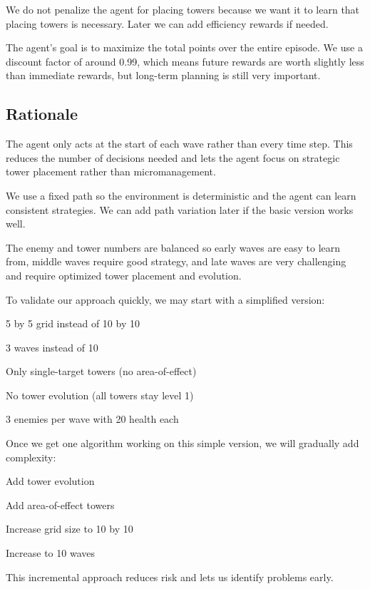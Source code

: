 \documentclass[12pt]{article}
\begin{document}
We do not penalize the agent for placing towers because we want it to learn that placing towers is necessary. Later we can add efficiency rewards if needed.

The agent's goal is to maximize the total points over the entire episode. We use a discount factor of around 0.99, which means future rewards are worth slightly less than immediate rewards, but long-term planning is still very important.

\subsection*{Rationale}

The agent only acts at the start of each wave rather than every time step. This reduces the number of decisions needed and lets the agent focus on strategic tower placement rather than micromanagement.

We use a fixed path so the environment is deterministic and the agent can learn consistent strategies. We can add path variation later if the basic version works well.

The enemy and tower numbers are balanced so early waves are easy to learn from, middle waves require good strategy, and late waves are very challenging and require optimized tower placement and evolution.

To validate our approach quickly, we may start with a simplified version:
\begin{compactitem}
\item 5 by 5 grid instead of 10 by 10
\item 3 waves instead of 10
\item Only single-target towers (no area-of-effect)
\item No tower evolution (all towers stay level 1)
\item 3 enemies per wave with 20 health each
\end{compactitem}

Once we get one algorithm working on this simple version, we will gradually add complexity:
\begin{compactitem}
\item Add tower evolution
\item Add area-of-effect towers
\item Increase grid size to 10 by 10
\item Increase to 10 waves
\end{compactitem}

This incremental approach reduces risk and lets us identify problems early.
\end{document}
